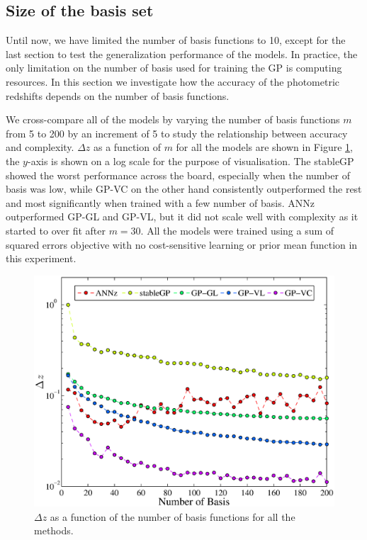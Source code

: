 \documentclass[useAMS,usenatbib,fleqn]{mn2e}
\begin{document}
\subsection{Size of the basis set}

Until now, we have limited the number of basis functions to 10, except for the last section to test the generalization performance of the models. In practice, the only limitation on the number of basis used for training the GP is computing resources. In this section we investigate how the accuracy of the photometric redshifts depends on the number of basis functions.

We cross-compare all of the models by varying the number of basis functions $m$ from 5 to 200 by an increment of 5 to study the relationship between accuracy and complexity. $\Delta z$ as a function of $m$ for all the models are shown in Figure \ref{fig-rmses}, the $y$-axis is shown on a log scale for the purpose of visualisation. The {\sc stableGP} showed the worst performance across the board, especially when the number of basis was low, while GP-VC on the other hand consistently outperformed the rest and most significantly when trained with a few number of basis. {\sc ANNz} outperformed GP-GL and GP-VL, but it did not scale well with complexity as it started to over fit after $m=30$. All the models were trained using a sum of squared errors objective with no cost-sensitive learning or prior mean function in this experiment. 

\begin{figure}
	\centering
	\includegraphics[width=\columnwidth]{figures/different-basis.eps}
	\caption{$\Delta z$ as a function of the number of basis functions for all the methods.}
	\label{fig-rmses}
\end{figure}
\end{document}
